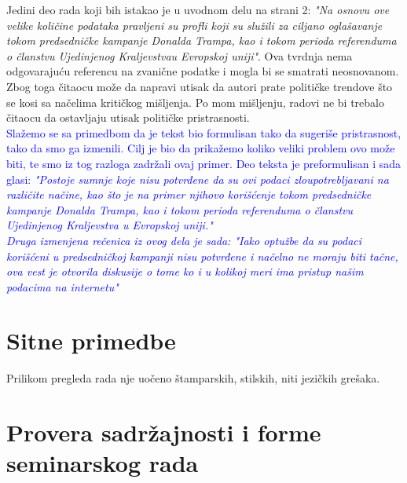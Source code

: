 \documentclass[a4paper]{report}
\newcommand{\odgovor}[1]{\textcolor{blue}{#1}}
\begin{document}
Jedini deo rada koji bih istakao je u uvodnom delu na strani 2: \emph{"Na osnovu ove velike količine podataka pravljeni su profli koji su služili za ciljano oglašavanje tokom predsedničke kampanje Donalda Trampa, kao i tokom perioda referenduma o članstvu Ujedinjenog Kraljevstvau Evropskoj uniji"}. Ova tvrdnja nema odgovarajuću referencu na zvanične podatke i mogla bi se smatrati neosnovanom. Zbog toga čitaocu može da napravi utisak da autori prate političke trendove što se kosi sa načelima kritičkog mišljenja. Po mom mišljenju, radovi ne bi trebalo čitaocu da ostavljaju utisak političke pristrasnosti.
\\
\odgovor{Slažemo se sa primedbom da je tekst bio formulisan tako da sugeriše pristrasnost, tako da smo ga izmenili. Cilj je bio da prikažemo koliko veliki problem ovo može biti, te smo iz tog razloga zadržali ovaj primer. Deo teksta je preformulisan i sada glasi: \emph{"Postoje sumnje koje nisu potvrđene da su ovi podaci zloupotrebljavani na različite načine, kao što je na primer njihovo korišćenje tokom predsedničke kampanje Donalda Trampa, kao i tokom perioda referenduma o članstvu Ujedinjenog Kraljevstva u Evropskoj uniji."\\ Druga izmenjena rečenica iz ovog dela je sada: "Iako optužbe da su podaci korišćeni u predsedničkoj kampanji nisu potvrđene i načelno ne moraju biti tačne, ova vest je otvorila diskusije o tome ko i u kolikoj meri ima pristup našim podacima na internetu"}}

\section{Sitne primedbe}

Prilikom pregleda rada nje uočeno štamparskih, stilskih, niti jezičkih grešaka.

\section{Provera sadržajnosti i forme seminarskog rada}
\end{document}
